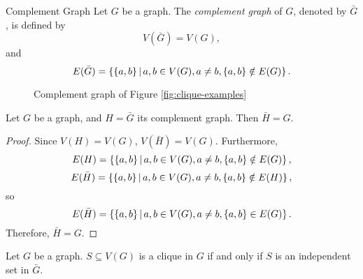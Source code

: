 \begin{defn}Complement Graph\proofbreak
    Let $G$ be a graph. The \emph{complement graph} of $G$, denoted by $\bar{G}$, is defined by
    \[V(\bar{G}) = V(G),\] and
    \[E(\bar{G}) = \left\{\{a, b\} \,\middle|\, a, b \in V(G), a \neq b, \{a, b\} \notin E(G) \right\}.\]
\end{defn}

\begin{figure}[ht!]
    \centering
\caption{Complement graph of Figure \ref{fig:clique-examples}}
\label{fig:complement-example}
\end{figure}

\begin{prop}
    Let $G$ be a graph, and $H = \bar{G}$ its complement graph. Then $\bar{H} = G$.
\end{prop}

\begin{proof}
    Since $V(H) = V(G)$, $V(\bar{H}) = V(G)$. Furthermore,
    \[E(H) = \left\{\{a, b\} \,\middle|\, a, b \in V(G), a \neq b, \{a, b\} \notin E(G) \right\},\] \[E(\bar{H}) = \left\{\{a, b\} \,\middle|\, a, b \in V(G), a \neq b, \{a, b\} \notin E(H) \right\},\] so \[E(\bar{H}) = \left\{\{a, b\} \,\middle|\, a, b \in V(G), a \neq b, \{a, b\} \in E(G) \right\}.\] Therefore, $\bar{H} = G$.
\end{proof}

\begin{lemma}\label{clique-independent-complement}
    Let $G$ be a graph. $S \subseteq V(G)$ is a clique in $G$ if and only if $S$ is an independent set in $\bar{G}$.
\end{lemma}

